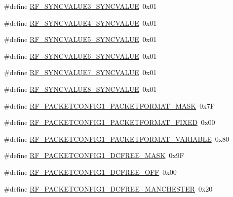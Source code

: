 \begin{DoxyCompactItemize}
\item 
\#define \mbox{\hyperlink{sx1276_regs-_fsk_8h_aced5402e8dbb4d7795d00b115981f2f4}{R\+F\+\_\+\+S\+Y\+N\+C\+V\+A\+L\+U\+E3\+\_\+\+S\+Y\+N\+C\+V\+A\+L\+UE}}~0x01
\item 
\#define \mbox{\hyperlink{sx1276_regs-_fsk_8h_adf2d6af9d59e50370870d65071817b10}{R\+F\+\_\+\+S\+Y\+N\+C\+V\+A\+L\+U\+E4\+\_\+\+S\+Y\+N\+C\+V\+A\+L\+UE}}~0x01
\item 
\#define \mbox{\hyperlink{sx1276_regs-_fsk_8h_ae874599f8f93c33fc5c2bdc53602ebe5}{R\+F\+\_\+\+S\+Y\+N\+C\+V\+A\+L\+U\+E5\+\_\+\+S\+Y\+N\+C\+V\+A\+L\+UE}}~0x01
\item 
\#define \mbox{\hyperlink{sx1276_regs-_fsk_8h_ab94bee7a110ee04831e6a396a3d2a890}{R\+F\+\_\+\+S\+Y\+N\+C\+V\+A\+L\+U\+E6\+\_\+\+S\+Y\+N\+C\+V\+A\+L\+UE}}~0x01
\item 
\#define \mbox{\hyperlink{sx1276_regs-_fsk_8h_a98fd9daba44f509a22b528f6ce39a8ca}{R\+F\+\_\+\+S\+Y\+N\+C\+V\+A\+L\+U\+E7\+\_\+\+S\+Y\+N\+C\+V\+A\+L\+UE}}~0x01
\item 
\#define \mbox{\hyperlink{sx1276_regs-_fsk_8h_aed618a9d802603a9727223a9b66fa39e}{R\+F\+\_\+\+S\+Y\+N\+C\+V\+A\+L\+U\+E8\+\_\+\+S\+Y\+N\+C\+V\+A\+L\+UE}}~0x01
\item 
\#define \mbox{\hyperlink{sx1276_regs-_fsk_8h_a49a5b9d17a41eac837198daf073a8bc2}{R\+F\+\_\+\+P\+A\+C\+K\+E\+T\+C\+O\+N\+F\+I\+G1\+\_\+\+P\+A\+C\+K\+E\+T\+F\+O\+R\+M\+A\+T\+\_\+\+M\+A\+SK}}~0x7F
\item 
\#define \mbox{\hyperlink{sx1276_regs-_fsk_8h_a9bcb87a30f7c182b7434cb87fdcb8187}{R\+F\+\_\+\+P\+A\+C\+K\+E\+T\+C\+O\+N\+F\+I\+G1\+\_\+\+P\+A\+C\+K\+E\+T\+F\+O\+R\+M\+A\+T\+\_\+\+F\+I\+X\+ED}}~0x00
\item 
\#define \mbox{\hyperlink{sx1276_regs-_fsk_8h_a3ea46ce872f527e487bfc9ad5bc04fda}{R\+F\+\_\+\+P\+A\+C\+K\+E\+T\+C\+O\+N\+F\+I\+G1\+\_\+\+P\+A\+C\+K\+E\+T\+F\+O\+R\+M\+A\+T\+\_\+\+V\+A\+R\+I\+A\+B\+LE}}~0x80
\item 
\#define \mbox{\hyperlink{sx1276_regs-_fsk_8h_a16146b7b76f771448f92a63952fed8ba}{R\+F\+\_\+\+P\+A\+C\+K\+E\+T\+C\+O\+N\+F\+I\+G1\+\_\+\+D\+C\+F\+R\+E\+E\+\_\+\+M\+A\+SK}}~0x9F
\item 
\#define \mbox{\hyperlink{sx1276_regs-_fsk_8h_a3ff7ed664dafac3f35c529684e793afd}{R\+F\+\_\+\+P\+A\+C\+K\+E\+T\+C\+O\+N\+F\+I\+G1\+\_\+\+D\+C\+F\+R\+E\+E\+\_\+\+O\+FF}}~0x00
\item 
\#define \mbox{\hyperlink{sx1276_regs-_fsk_8h_aa8d6a62ddb02dee4e3d477c9c6a7e621}{R\+F\+\_\+\+P\+A\+C\+K\+E\+T\+C\+O\+N\+F\+I\+G1\+\_\+\+D\+C\+F\+R\+E\+E\+\_\+\+M\+A\+N\+C\+H\+E\+S\+T\+ER}}~0x20

\end{DoxyCompactItemize}
